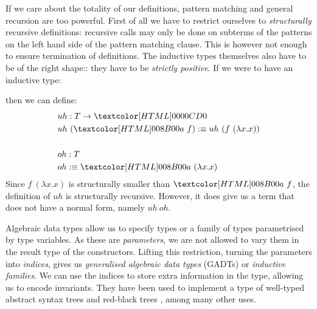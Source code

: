 If we care about the totality of our definitions, pattern matching and
general recursion are too powerful. First of all we have to restrict
ourselves to \emph{structurally} recursive definitions: recursive
calls may only be done on subterms of the patterns on the left hand
side of the pattern matching clause. This is however not enough to
ensure termination of definitions. The inductive types themselves also
have to be of the right shape:: they have to be \emph{strictly
positive}. If we were to have an inductive type:
%
\begin{datatype}{\Tty}{\Type}
  \constr{\Ta}{(\Tty \to \Tty) \to \Tty}
\end{datatype}
then we can define:
\begin{align*}
  &uh : T \to \emptyty \\
  &uh\ (\Ta\ f) \ddefeq uh\ (f\ (\lambda x . x)) \\
  \\
  &oh : T \\
  &oh \ddefeq \Ta\ (\lambda x . x)
\end{align*}
%
Since $f\ (\lambda x . x)$ is structurally smaller than $\Ta\ f$, the
definition of $uh$ is structurally recursive. However, it does give us
a term that does not have a normal form, namely $uh\ oh$.

Algebraic data types allow us to specify types or a family of types
parametrised by type variables. As these are \emph{parameters}, we are
not allowed to vary them in the result type of the
constructors. Lifting this restriction, \ie turning the parameters
into \emph{indices}, gives us \emph{generalised algebraic data types}
(GADTs) or \emph{inductive families}. We can use the indices to store
extra information in the type, allowing us to encode invariants. They
have been used to implement a type of well-typed abstract syntax trees
\cite{Pavsalic2004} and red-black trees \cite{Kahrs2001}, among many
other uses.

